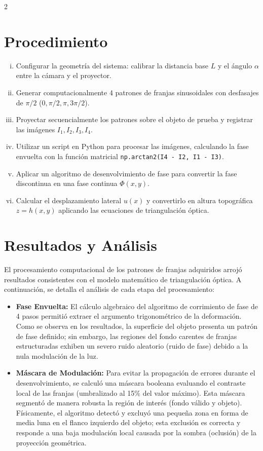 \documentclass[letterpaper]{article}
\begin{document}
\begin{multicols}{2}
		\section*{Procedimiento}
		
		\begin{enumerate}[i)]
			\item Configurar la geometría del sistema: calibrar la distancia base $L$ y el ángulo $\alpha$ entre la cámara y el proyector.
			\item Generar computacionalmente 4 patrones de franjas sinusoidales con desfasajes de $\pi/2$ ($0, \pi/2, \pi, 3\pi/2$).
			\item Proyectar secuencialmente los patrones sobre el objeto de prueba y registrar las imágenes $I_1, I_2, I_3, I_4$.
			\item Utilizar un script en Python para procesar las imágenes, calculando la fase envuelta con la función matricial \texttt{np.arctan2(I4 - I2, I1 - I3)}.
			\item Aplicar un algoritmo de desenvolvimiento de fase para convertir la fase discontinua en una fase continua $\Phi(x,y)$.
			\item Calcular el desplazamiento lateral $u(x)$ y convertirlo en altura topográfica $z = h(x,y)$ aplicando las ecuaciones de triangulación óptica.
		\end{enumerate}
		
		\section*{Resultados y Análisis}
		
		El procesamiento computacional de los patrones de franjas adquiridos arrojó resultados consistentes con el modelo matemático de triangulación óptica. A continuación, se detalla el análisis de cada etapa del procesamiento:
		
		\begin{itemize}
			\item \textbf{Fase Envuelta:} El cálculo algebraico del algoritmo de corrimiento de fase de 4 pasos permitió extraer el argumento trigonométrico de la deformación. Como se observa en los resultados, la superficie del objeto presenta un patrón de fase definido; sin embargo, las regiones del fondo carentes de franjas estructuradas exhiben un severo ruido aleatorio (ruido de fase) debido a la nula modulación de la luz.
			
			\item \textbf{Máscara de Modulación:} Para evitar la propagación de errores durante el desenvolvimiento, se calculó una máscara booleana evaluando el contraste local de las franjas (umbralizado al 15\% del valor máximo). Esta máscara segmentó de manera robusta la región de interés (fondo válido y objeto). Físicamente, el algoritmo detectó y excluyó una pequeña zona en forma de media luna en el flanco izquierdo del objeto; esta exclusión es correcta y responde a una baja modulación local causada por la sombra (oclusión) de la proyección geométrica.
			

\end{itemize}
\end{multicols}
\end{document}
